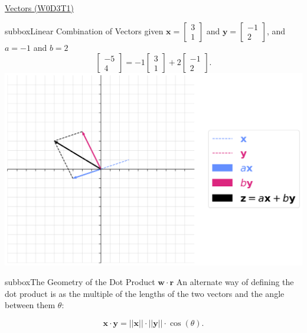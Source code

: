\begin{multicols}{3}
\begin{textbox}{\href{https://compneuro.neuromatch.io/tutorials/W0D3_LinearAlgebra/student/W0D3_Tutorial1.html}{Vectors (W0D3T1) }}
\begin{subbox}{subbox}{Linear Combination of Vectors}
given $\mathbf{x} = \begin{bmatrix}3 \\ 1 \end{bmatrix}$ and $\mathbf{y} = \begin{bmatrix}-1 \\ 2 \end{bmatrix}$, and $a=-1$ and $b=2$
\begin{equation*}
\begin{bmatrix}-5 \\ 4 \end{bmatrix}= -1\begin{bmatrix}3 \\ 1 \end{bmatrix} +2 \begin{bmatrix}-1 \\ 2 \end{bmatrix}.
\end{equation*}
\centering
\includegraphics[scale=0.15]{Figures/PreCourse/Figure3.png}
\end{subbox}
\begin{subbox}{subbox}{The Geometry of the Dot Product $\mathbf{w}\cdot\mathbf{r}$}
\scriptsize
An alternate way of defining the dot product is as the multiple of the lengths of the two vectors and the angle between them $\theta$:

\begin{equation}
\mathbf{x} \cdot \mathbf{y} = ||\mathbf{x}|| \cdot ||\mathbf{y}|| \cdot \cos(\theta).
\end{equation}


\end{subbox}
\end{textbox}
\end{multicols}
